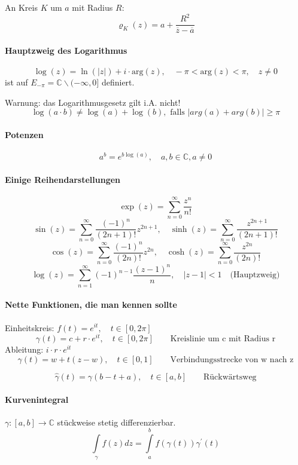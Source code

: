 \documentclass[a4paper, 10pt, DIV20, headings=small]{scrartcl}
\theoremstyle{definition}
\theoremstyle{plain}
\begin{document}
An Kreis $K$ um $a$ mit Radius $R$:
$$\varrho_K(z) = a + \frac{R^2}{\overline{z}- \overline{a}}$$

\paragraph{Hauptzweig des Logarithmus}
$$\log(z) = \ln(|z|) + i \cdot \text{arg}(z), \quad -\pi < \text{arg}(z) < \pi, \quad z \neq 0$$
ist auf $E_{- \pi} = \mathbb{C} \backslash (-\infty,0]$ definiert.

Warnung: das Logarithmusgesetz gilt i.A. nicht!
$$\log(a \cdot b) \neq \log(a) + \log(b), \text{ falls } |arg(a)+arg(b)| \geq \pi$$

\paragraph{Potenzen}
$$a^b = e^{b \log (a)}, \quad a,b \in \mathbb{C}, a \neq 0$$

\paragraph{Einige Reihendarstellungen}
$$\exp(z) = \sum\limits_{n=0}^\infty{\frac{z^n}{n!}}$$
$$\sin(z) = \sum\limits_{n=0}^\infty{\frac{(-1)^n}{(2n+1)!} z^{2n+1}}, \quad \sinh(z) = \sum\limits_{n=0}^\infty{\frac{z^{2n+1}}{(2n+1)!}}$$
$$\cos(z) = \sum\limits_{n=0}^\infty{\frac{(-1)^n}{(2n)!} z^{2n}}, \quad \cosh(z) = \sum\limits_{n=0}^\infty{\frac{z^{2n}}{(2n)!}}$$
$$\log(z) = \sum\limits_{n=1}^\infty{(-1)^{n-1} \frac{(z-1)^n}{n}}, \quad |z-1|<1 \quad \text{(Hauptzweig)}$$

\paragraph{Nette Funktionen, die man kennen sollte}
Einheitskreis: $f(t)=e^{it}, \quad t \in [0,2\pi]$
$$\gamma(t) = c + r \cdot e^{it}, \quad t \in [0,2\pi] \qquad \text{Kreislinie um c mit Radius r}$$ Ableitung: $i \cdot r \cdot e^{it}$
$$\gamma(t) =w+ t(z-w), \quad t \in [0,1] \qquad \text{Verbindungsstrecke von w nach z}$$

$$\hat{\gamma}(t) = \gamma(b-t+a), \quad t \in [a,b] \qquad \text{Rückwärtsweg}$$

\paragraph{Kurvenintegral}
$\gamma \colon [a,b] \rightarrow \mathbb{C}$ stückweise stetig differenzierbar.
$$\int\limits_{\gamma} f(z) dz = \int\limits_{a}^{b}{f(\gamma(t)) \gamma^\prime(t)}$$
\end{document}

